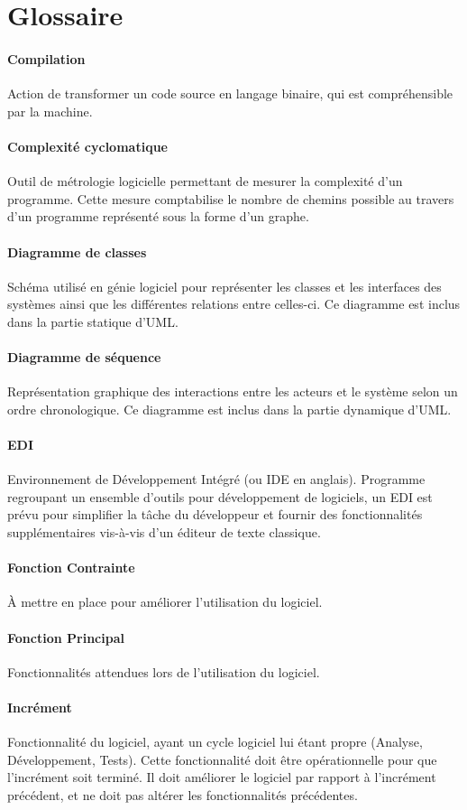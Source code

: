 \documentclass[12pt,a4paper,openany]{article}
\begin{document}
\section{Glossaire}
	\paragraph{Compilation} Action de transformer un code source en langage binaire, qui est compréhensible par la machine. 
	\paragraph{Complexité cyclomatique} Outil de métrologie logicielle permettant de mesurer la complexité d'un programme. Cette mesure comptabilise le nombre de chemins possible au travers d'un programme représenté sous la forme d'un graphe.
	\paragraph{Diagramme de classes} Schéma utilisé en génie logiciel pour représenter les classes et les interfaces des systèmes
	ainsi que les différentes relations entre celles-ci. Ce diagramme est inclus dans la partie statique d'UML.
	\paragraph{Diagramme de séquence} Représentation graphique des interactions entre les acteurs et le système selon un ordre 
	chronologique. Ce diagramme est inclus dans la partie dynamique d'UML.
	\paragraph{EDI} Environnement de Développement Intégré (ou IDE en anglais). Programme regroupant un ensemble d'outils pour développement de logiciels, un EDI
	est prévu pour simplifier la tâche du développeur et fournir des fonctionnalités supplémentaires vis-à-vis d'un éditeur de texte classique.
	\paragraph{Fonction Contrainte}
	À mettre en place pour améliorer l'utilisation du logiciel.
	\paragraph{Fonction Principal}
	Fonctionnalités attendues lors de l'utilisation du logiciel.
	\paragraph{Incrément} Fonctionnalité du logiciel, ayant un cycle logiciel lui étant propre (Analyse, Développement, Tests). Cette 
	fonctionnalité doit être opérationnelle pour que l'incrément soit terminé. Il doit améliorer le logiciel par rapport à l'incrément précédent, 
	et ne doit pas altérer les fonctionnalités précédentes.
\end{document}
